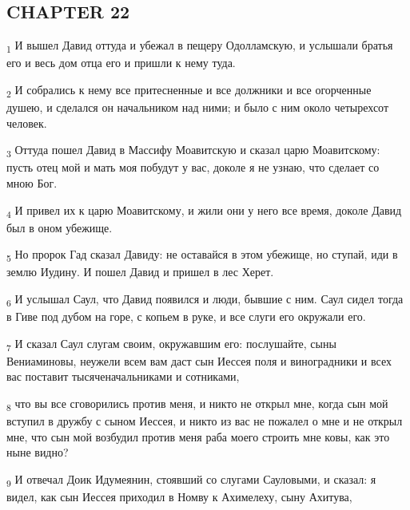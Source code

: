\subsection{CHAPTER 22}
\begin{tcolorbox}
\textsubscript{1} И вышел Давид оттуда и убежал в пещеру Одолламскую, и услышали братья его и весь дом отца его и пришли к нему туда.
\end{tcolorbox}
\begin{tcolorbox}
\textsubscript{2} И собрались к нему все притесненные и все должники и все огорченные душею, и сделался он начальником над ними; и было с ним около четырехсот человек.
\end{tcolorbox}
\begin{tcolorbox}
\textsubscript{3} Оттуда пошел Давид в Массифу Моавитскую и сказал царю Моавитскому: пусть отец мой и мать моя побудут у вас, доколе я не узнаю, что сделает со мною Бог.
\end{tcolorbox}
\begin{tcolorbox}
\textsubscript{4} И привел их к царю Моавитскому, и жили они у него все время, доколе Давид был в оном убежище.
\end{tcolorbox}
\begin{tcolorbox}
\textsubscript{5} Но пророк Гад сказал Давиду: не оставайся в этом убежище, но ступай, иди в землю Иудину. И пошел Давид и пришел в лес Херет.
\end{tcolorbox}
\begin{tcolorbox}
\textsubscript{6} И услышал Саул, что Давид появился и люди, бывшие с ним. Саул сидел тогда в Гиве под дубом на горе, с копьем в руке, и все слуги его окружали его.
\end{tcolorbox}
\begin{tcolorbox}
\textsubscript{7} И сказал Саул слугам своим, окружавшим его: послушайте, сыны Вениаминовы, неужели всем вам даст сын Иессея поля и виноградники и всех вас поставит тысяченачальниками и сотниками,
\end{tcolorbox}
\begin{tcolorbox}
\textsubscript{8} что вы все сговорились против меня, и никто не открыл мне, когда сын мой вступил в дружбу с сыном Иессея, и никто из вас не пожалел о мне и не открыл мне, что сын мой возбудил против меня раба моего строить мне ковы, как это ныне видно?
\end{tcolorbox}
\begin{tcolorbox}
\textsubscript{9} И отвечал Доик Идумеянин, стоявший со слугами Сауловыми, и сказал: я видел, как сын Иессея приходил в Номву к Ахимелеху, сыну Ахитува,
\end{tcolorbox}
